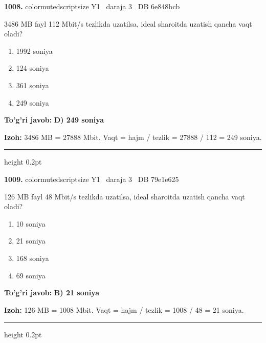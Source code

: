 \documentclass[10pt,a4paper,oneside]{article}
\begin{document}
\noindent\textbf{\color{ink}1008.}  {color{muted}scriptsize Y1 \textbullet\ daraja 3 \textbullet\ DB 6e848bcb}
\par
3486 MB fayl 112 Mbit/s tezlikda uzatilsa, ideal sharoitda uzatish qancha vaqt oladi?
\begin{enumerate}[label=\Alph*),leftmargin=9mm]
\item 1992 soniya
\item 124 soniya
\item 361 soniya
\item 249 soniya
\end{enumerate}
\begin{tcolorbox}[enhanced,breakable,colback=teal!4,colframe=teal!50!black,boxrule=0.5pt,arc=1.1mm,left=3mm,right=3mm,top=1.7mm,bottom=1.7mm,before skip=2mm,after skip=2mm]
\textbf{\color{teal}To'g'ri javob:} \textbf{D) 249 soniya}
\par\smallskip
\textbf{Izoh:} 3486 MB = 27888 Mbit. Vaqt = hajm / tezlik = 27888 / 112 = 249 soniya.
\end{tcolorbox}
\vspace{2mm}\hrule height 0.2pt \vspace{3mm}

\noindent\textbf{\color{ink}1009.}  {color{muted}scriptsize Y1 \textbullet\ daraja 3 \textbullet\ DB 79e1e625}
\par
126 MB fayl 48 Mbit/s tezlikda uzatilsa, ideal sharoitda uzatish qancha vaqt oladi?
\begin{enumerate}[label=\Alph*),leftmargin=9mm]
\item 10 soniya
\item 21 soniya
\item 168 soniya
\item 69 soniya
\end{enumerate}
\begin{tcolorbox}[enhanced,breakable,colback=teal!4,colframe=teal!50!black,boxrule=0.5pt,arc=1.1mm,left=3mm,right=3mm,top=1.7mm,bottom=1.7mm,before skip=2mm,after skip=2mm]
\textbf{\color{teal}To'g'ri javob:} \textbf{B) 21 soniya}
\par\smallskip
\textbf{Izoh:} 126 MB = 1008 Mbit. Vaqt = hajm / tezlik = 1008 / 48 = 21 soniya.
\end{tcolorbox}
\vspace{2mm}\hrule height 0.2pt \vspace{3mm}
\end{document}

